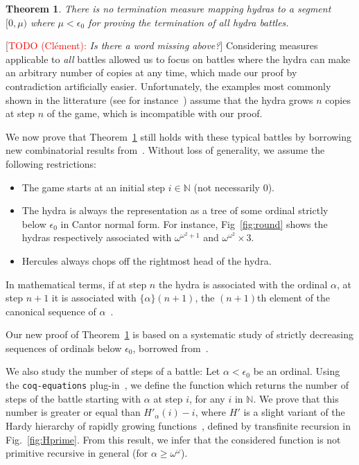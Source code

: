\documentclass{easychair}
\newtheorem{theorem}{Theorem}
\newcommand{\canonseq}[2]{\mbox{$\{#1\}(#2)$}}
\newcommand{\TODO}[2][]{[\textcolor{red}{TODO (#1):} \emph{#2}]}
\begin{document}
\begin{theorem}
  There is no termination measure mapping hydras to a segment $[0,\mu)$ where $\mu<\epsilon_0$ for proving the termination of  all hydra battles.\label{thm3}
\end{theorem}

\TODO[Clément]{Is there a word missing above?}
Considering measures applicable to \emph{all} battles allowed us to
focus on battles where the hydra can make an arbitrary number of copies at any time, which made our proof by contradiction artificially easier.
Unfortunately, the examples  most commonly shown in the litterature
(see for instance~\cite{KP82, bauer2008, BauerHydra}) 
assume that the hydra grows $n$ copies at step $n$ of the game, which is incompatible with our proof.

\vspace{6pt}

We now prove that Theorem~\ref{thm3} still holds with these typical battles by borrowing new combinatorial results from~\cite{KS81}.
Without loss of generality, we assume the following restrictions:
 
 \begin{itemize}
   \item The game starts at an initial step $i\in\mathbb{N}$ (not necessarily $0$).
   \item  The hydra is always the  representation as a tree of some ordinal strictly below $\epsilon_0$ in Cantor normal
     form. For instance, Fig~\ref{fig:round} shows the hydras respectively associated with  $\omega^{\omega^2+1}$ and $\omega^{\omega^2}\times 3$.
 
 \item Hercules always chops off the rightmost head of the hydra.
 \end{itemize}
 
 In mathematical terms, if at step $n$ the hydra is associated with the ordinal $\alpha$, at step $n+1$ it is associated with
 $\canonseq{\alpha}{n+1}$, the $(n+1)$th element of the canonical sequence of $\alpha$~\cite{KS81}.

 Our new proof of Theorem~\ref{thm3} is based on a systematic study of strictly decreasing sequences of ordinals below $\epsilon_0$, borrowed from~\cite{KS81}.
 
We also study the number of steps of a battle:
Let $\alpha<\epsilon_0$ be an ordinal.
Using the \texttt{coq-equations} plug-in~\cite{sozeau:hal-01671777}, we define the function which returns the number of steps of the battle starting with $\alpha$ at step $i$, for  any $i$ in $\mathbb{N}$.
We prove that this number is greater or equal than
$H'_\alpha(i)-i$, where $H'$ is a slight variant of the Hardy hierarchy of rapidly growing functions~\cite{BW85, KS81, Promel2013, Wainer1970}, defined by transfinite recursion in Fig.~\ref{fig:Hprime}. 
From this result, we infer that the considered function is not primitive recursive in general (for $\alpha\geq\omega^\omega$).
\end{document}
